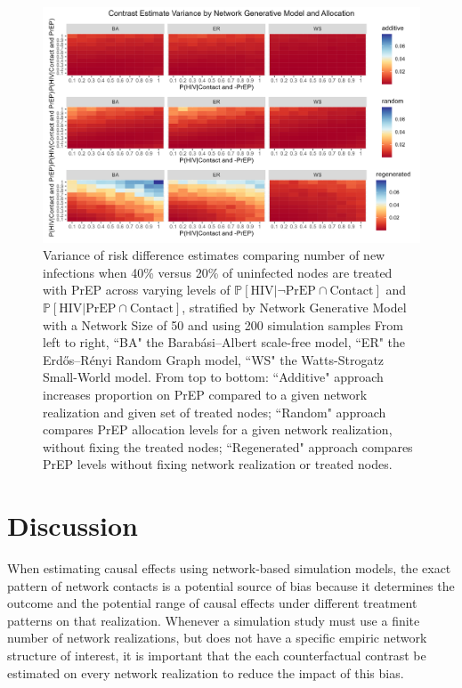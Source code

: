 \documentclass{article}
\theoremstyle{definition}
\begin{document}
\begin{figure}[H]
    \centering
    \includegraphics[width=\linewidth]{Figures/Generative Model Variance plots.png}
    \caption{Variance of risk difference estimates comparing number of new infections when 40\% versus 20\% of uninfected nodes are treated with PrEP across varying levels of $\mathbb{P}\left[\text{HIV} \vert \neg \text{PrEP} \cap \text{Contact}\right]$ and $\mathbb{P}\left[\text{HIV} \vert \text{PrEP} \cap \text{Contact}\right]$, stratified by Network Generative Model with a Network Size of 50 and using 200 simulation samples %
    From left to right, ``BA" the Barabási–Albert scale-free model, ``ER" the Erdős–Rényi Random Graph model, ``WS" the Watts-Strogatz Small-World model. From top to bottom: ``Additive" approach increases proportion on PrEP compared to a given network realization and given set of treated nodes; ``Random" approach compares PrEP allocation levels for a given network realization, without fixing the treated nodes; ``Regenerated" approach compares PrEP levels without fixing network realization or treated nodes. 
    }
    \label{fig:Figure 13}
\end{figure}


\section{Discussion}

 When estimating causal effects using network-based simulation models, the exact pattern of network contacts is a potential source of bias because it determines the outcome and the potential range of causal effects under different treatment patterns on that realization. Whenever a simulation study must use a finite number of network realizations, but does not have a specific empiric network structure of interest, it is important that the each counterfactual contrast be estimated on every network realization to reduce the impact of this bias. 
\end{document}
